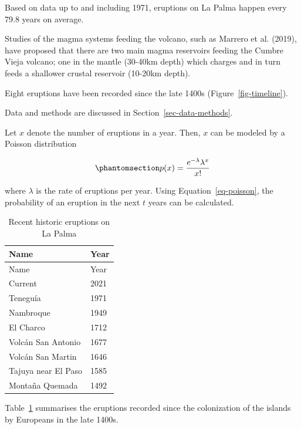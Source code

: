 \documentclass[
]{agujournal2019}
\begin{document}
Based on data up to and including 1971, eruptions on La Palma happen
every 79.8 years on average.

Studies of the magma systems feeding the volcano, such as Marrero et al.
(2019), have proposed that there are two main magma reservoirs feeding
the Cumbre Vieja volcano; one in the mantle (30-40km depth) which
charges and in turn feeds a shallower crustal reservoir (10-20km depth).

Eight eruptions have been recorded since the late 1400s
(Figure~\ref{fig-timeline}).

Data and methods are discussed in Section~\ref{sec-data-methods}.

Let \(x\) denote the number of eruptions in a year. Then, \(x\) can be
modeled by a Poisson distribution

\begin{equation}\phantomsection\label{eq-poisson}{
p(x) = \frac{e^{-\lambda} \lambda^{x}}{x !}
}\end{equation}

where \(\lambda\) is the rate of eruptions per year. Using
Equation~\ref{eq-poisson}, the probability of an eruption in the next
\(t\) years can be calculated.

\begin{longtable}[]{@{}ll@{}}
\caption{Recent historic eruptions on La
Palma}\label{tbl-history}\tabularnewline
\toprule\noalign{}
Name & Year \\
\midrule\noalign{}
\endfirsthead
\toprule\noalign{}
Name & Year \\
\midrule\noalign{}
\endhead
\bottomrule\noalign{}
\endlastfoot
Current & 2021 \\
Teneguía & 1971 \\
Nambroque & 1949 \\
El Charco & 1712 \\
Volcán San Antonio & 1677 \\
Volcán San Martin & 1646 \\
Tajuya near El Paso & 1585 \\
Montaña Quemada & 1492 \\
\end{longtable}

Table~\ref{tbl-history} summarises the eruptions recorded since the
colonization of the islands by Europeans in the late 1400s.
\end{document}
